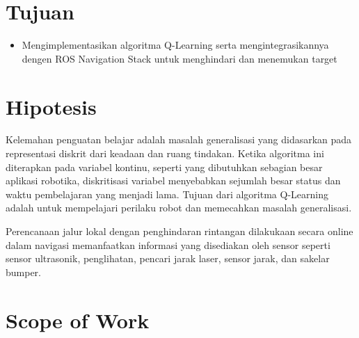\section{Tujuan}
\begin{itemize}
	\item Mengimplementasikan algoritma Q-Learning serta mengintegrasikannya dengen ROS Navigation Stack untuk menghindari dan menemukan target

\end{itemize}


\section{Hipotesis}
   
Kelemahan penguatan belajar adalah masalah generalisasi yang didasarkan pada representasi diskrit dari keadaan dan ruang tindakan. Ketika algoritma ini diterapkan pada variabel kontinu, seperti yang dibutuhkan sebagian besar aplikasi robotika, diskritisasi variabel menyebabkan sejumlah besar status dan waktu pembelajaran yang menjadi lama. Tujuan dari algoritma Q-Learning adalah untuk mempelajari perilaku robot dan memecahkan masalah generalisasi.

Perencanaan jalur lokal dengan penghindaran rintangan dilakukaan secara online dalam navigasi memanfaatkan informasi yang disediakan oleh sensor seperti sensor ultrasonik, penglihatan, pencari jarak laser, sensor jarak, dan sakelar bumper.



\section{Scope of Work}

